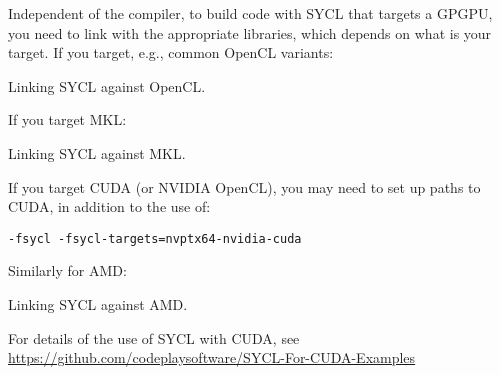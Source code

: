 Independent of the compiler, to build code with SYCL that targets a GPGPU, you need to link with the appropriate libraries, which depends on what is your target. 
If you target, e.g., common OpenCL variants: 


\raggedbottom
\begin{codebox}[]{}
\footnotesize Linking SYCL against OpenCL.
\tcblower
{}
\end{codebox}

If you target MKL:

\raggedbottom
\begin{codebox}[]{}
\footnotesize Linking SYCL against MKL.
\tcblower
{}
\end{codebox}

If you target CUDA (or NVIDIA OpenCL), you may need to set up paths to CUDA, in addition to the use of:

\begin{verbatim}
-fsycl -fsycl-targets=nvptx64-nvidia-cuda
\end{verbatim}

Similarly for AMD:

\raggedbottom
\begin{codebox}[]{}
\footnotesize Linking SYCL against AMD.
\tcblower
{}
\end{codebox}

For details of the use of SYCL with CUDA, see \url{https://github.com/codeplaysoftware/SYCL-For-CUDA-Examples}
